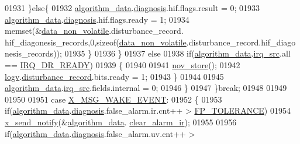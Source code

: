 \begin{DoxyCode}
01931                          \}\textcolor{keywordflow}{else}\{
01932                             \hyperlink{a00038_a183caa40cd01e79ee309cc9c4a225197}{algorithm\_data}.\hyperlink{a00016_a16f85d57ec98b4ad05f5a2e10536b3c6}{diagnosis}.hif.flags.result = 0;
01933                             \hyperlink{a00038_a183caa40cd01e79ee309cc9c4a225197}{algorithm\_data}.\hyperlink{a00016_a16f85d57ec98b4ad05f5a2e10536b3c6}{diagnosis}.hif.flags.ready  = 1;
01934                             memset(&\hyperlink{a00060_a76ac5f917f5308dcd83de0d7c94559fb}{data\_non\_volatile}.disturbance\_record.
      hif\_diagonesis\_records,0,\textcolor{keyword}{sizeof}(\hyperlink{a00060_a76ac5f917f5308dcd83de0d7c94559fb}{data\_non\_volatile}.disturbance\_record.hif\_diagonesis\_records));
01935                          \}
01936                     \}
01937                     \textcolor{keywordflow}{else}
01938                     \textcolor{keywordflow}{if}(\hyperlink{a00038_a183caa40cd01e79ee309cc9c4a225197}{algorithm\_data}.\hyperlink{a00016_a1aafd556b3c9ed3e5295b17dbd80cab8}{irq\_src}.all == 
      \hyperlink{a00021_acfd80444497090bce928df199247a0ec}{IRQ\_DR\_READY})
01939                     \{
01940                         
01941                         \hyperlink{a00029_a90aef186f45a15d94bf0247122194991}{nov\_store}();
01942                         \hyperlink{a00038_a2e89c46668b39a17753c238950c9e1ec}{logv}.\hyperlink{a00021_a11ed024c2cc5c53c79b2c0a8b35e3c06}{disturbance\_record}.bits.ready = 1;
01943                     \}
01944 
01945                     \hyperlink{a00038_a183caa40cd01e79ee309cc9c4a225197}{algorithm\_data}.\hyperlink{a00016_a1aafd556b3c9ed3e5295b17dbd80cab8}{irq\_src}.fields.internal = 0;
01946          \}
01947         \}\textcolor{keywordflow}{break};
01948 
01949 
01950 
01951         \textcolor{keywordflow}{case} \hyperlink{a00016_ae6be514b1d949dc71420a3e549772995}{X\_MSG\_WAKE\_EVENT}:
01952         \{
01953               \textcolor{keywordflow}{if}(\hyperlink{a00038_a183caa40cd01e79ee309cc9c4a225197}{algorithm\_data}.\hyperlink{a00016_a16f85d57ec98b4ad05f5a2e10536b3c6}{diagnosis}.false\_alarm.ir.cnt++ > 
      \hyperlink{a00017_a946f0acff4fd16a65859479e9e0b9513}{FP\_TOLERANCE})
01954               \hyperlink{a00036_ae17b0bb16da3c471bb6074bb4c4d0fee}{x\_send\_notify}(&\hyperlink{a00038_a183caa40cd01e79ee309cc9c4a225197}{algorithm\_data}.
      \hyperlink{a00016_a5ef7ebf1a1e20f770d46232ab2be8312}{clear\_alarm\_ir});
01955 
01956               \textcolor{keywordflow}{if}(\hyperlink{a00038_a183caa40cd01e79ee309cc9c4a225197}{algorithm\_data}.\hyperlink{a00016_a16f85d57ec98b4ad05f5a2e10536b3c6}{diagnosis}.false\_alarm.uv.cnt++ > 

\end{DoxyCode}
